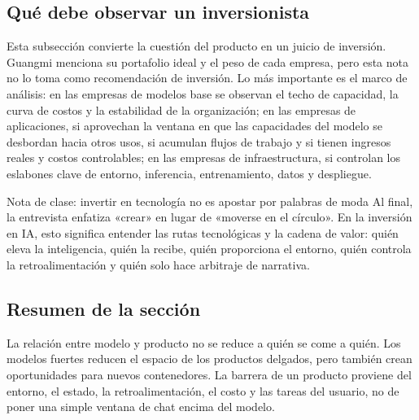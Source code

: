 \subsection{Qué debe observar un inversionista}

Esta subsección convierte la cuestión del producto en un juicio de inversión. Guangmi menciona su portafolio ideal y el peso de cada empresa, pero esta nota no lo toma como recomendación de inversión. Lo más importante es el marco de análisis: en las empresas de modelos base se observan el techo de capacidad, la curva de costos y la estabilidad de la organización; en las empresas de aplicaciones, si aprovechan la ventana en que las capacidades del modelo se desbordan hacia otros usos, si acumulan flujos de trabajo y si tienen ingresos reales y costos controlables; en las empresas de infraestructura, si controlan los eslabones clave de entorno, inferencia, entrenamiento, datos y despliegue.

\begin{knowledgebox}{Nota de clase: invertir en tecnología no es apostar por palabras de moda}
Al final, la entrevista enfatiza «crear» en lugar de «moverse en el círculo». En la inversión en IA, esto significa entender las rutas tecnológicas y la cadena de valor: quién eleva la inteligencia, quién la recibe, quién proporciona el entorno, quién controla la retroalimentación y quién solo hace arbitraje de narrativa.
\end{knowledgebox}

\subsection{Resumen de la sección}

La relación entre modelo y producto no se reduce a quién se come a quién. Los modelos fuertes reducen el espacio de los productos delgados, pero también crean oportunidades para nuevos contenedores. La barrera de un producto proviene del entorno, el estado, la retroalimentación, el costo y las tareas del usuario, no de poner una simple ventana de chat encima del modelo.
